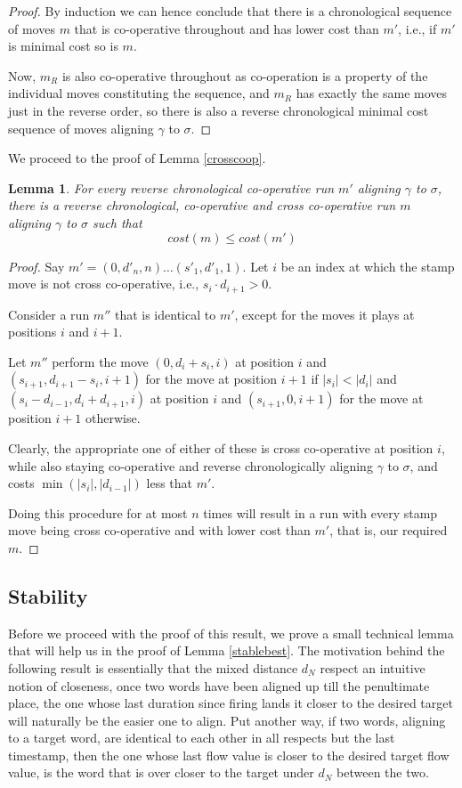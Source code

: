 \documentclass[conference]{IEEEtran}
\newtheorem*{lemma*}{Lemma}
\begin{document}
\begin{proof}
By induction we can hence conclude that there is a chronological sequence of moves $m$ that is co-operative throughout and has lower cost than $m'$, i.e., if $m'$ is minimal cost so is $m$.  

Now, $m_R$ is also co-operative throughout as co-operation is a property of the individual moves constituting the sequence, and $m_R$ has exactly the same moves just in the reverse order, so there is also a reverse chronological minimal cost sequence of moves aligning $\gamma$ to $\sigma$. 

\end{proof}

We proceed to the proof of Lemma \ref{crosscoop}. 

\begin{lemma*}	For every reverse chronological co-operative run $m'$ aligning $\gamma$ to $\sigma$, there is a reverse chronological, co-operative and cross co-operative run $m$ aligning $\gamma$ to $\sigma$ such that $$cost(m) \leq cost(m')$$
\end{lemma*}

\begin{proof}
Say $m' = (0, d'_n, n) \dots (s'_1, d'_1, 1)$. 
Let $i$ be an index at which the stamp move is not cross co-operative, i.e., $s_i \cdot d_{i+1} > 0$. 

Consider a run $m''$ that is identical to $m'$, except for the moves it plays at positions $i$ and $i+1$.   

Let $m''$ perform the move $(0, d_i + s_i, i)$ at position $i$ and $(s_{i+1}, d_{i+1} - s_{i}, i+1)$ for the move at position $i+1$ if $|s_i| < |d_i|$ and $(s_i - d_{i-1}, d_i + d_{i+1}, i)$ at position $i$ and $(s_{i+1}, 0, i+1)$ for the move at position $i+1$ otherwise. 

Clearly, the appropriate one of either of these is cross co-operative at position $i$, while also staying co-operative and reverse chronologically aligning $\gamma$ to $\sigma$, and costs $\min(|s_i|, |d_{i-1}|)$ less that $m'$. 

Doing this procedure for at most $n$ times will result in a run with every stamp move being cross co-operative and with lower cost than $m'$, that is, our required $m$. 
\end{proof}

\subsection{Stability} 
Before we proceed with the proof of this result, we prove a small technical lemma that will help us in the proof of Lemma \ref{stablebest}. The motivation behind the following result is essentially that the mixed distance $d_N$ respect an intuitive notion of closeness, once two words have been aligned up till the penultimate place, the one whose last duration since firing lands it closer to the desired target will naturally be the easier one to align. Put another way, if two words, aligning to a target word, are identical to each other in all respects but the last timestamp, then the one whose last flow value is closer to the desired target flow value, is the word that is over closer to the target under $d_N$ between the two. 
\end{document}
